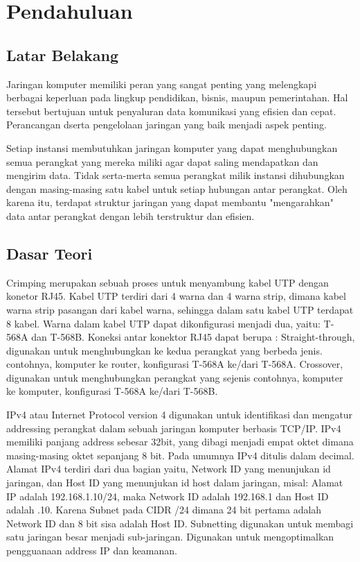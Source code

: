 \section{Pendahuluan}
\subsection{Latar Belakang}
Jaringan komputer memiliki peran yang sangat penting yang melengkapi berbagai keperluan pada lingkup pendidikan, bisnis, maupun pemerintahan. Hal tersebut bertujuan untuk penyaluran data komunikasi yang efisien dan cepat. Perancangan dserta pengelolaan jaringan yang baik menjadi aspek penting.

Setiap instansi membutuhkan jaringan komputer yang dapat menghubungkan semua perangkat yang mereka miliki agar dapat saling mendapatkan dan mengirim data. Tidak serta-merta semua perangkat milik instansi dihubungkan dengan masing-masing satu kabel untuk setiap hubungan antar perangkat. Oleh karena itu, terdapat struktur jaringan yang dapat membantu "mengarahkan" data antar perangkat dengan lebih terstruktur dan efisien.

\subsection{Dasar Teori}
Crimping merupakan sebuah proses untuk menyambung kabel UTP dengan konetor RJ45. Kabel UTP terdiri dari 4 warna dan 4 warna strip, dimana kabel warna strip pasangan dari kabel warna, sehingga dalam satu kabel UTP terdapat 8 kabel. Warna dalam kabel UTP dapat dikonfigurasi menjadi dua, yaitu: T-568A dan T-568B. Koneksi antar konektor RJ45 dapat berupa : Straight-through, digunakan untuk menghubungkan ke kedua perangkat yang berbeda jenis. contohnya, komputer ke router, konfigurasi T-568A ke/dari T-568A. Crossover, digunakan untuk menghubungkan perangkat yang sejenis contohnya, komputer ke komputer, konfigurasi T-568A ke/dari T-568B.

IPv4 atau Internet Protocol version 4 digunakan untuk identifikasi dan mengatur addressing perangkat dalam sebuah jaringan komputer berbasis TCP/IP. IPv4 memiliki panjang address sebesar 32bit, yang dibagi menjadi empat oktet dimana masing-masing oktet sepanjang 8 bit. Pada umumnya IPv4 ditulis dalam decimal. Alamat IPv4 terdiri dari dua bagian yaitu, Network ID yang menunjukan id jaringan, dan Host ID yang menunjukan id host dalam jaringan, misal: Alamat IP adalah 192.168.1.10/24, maka Network ID adalah 192.168.1 dan Host ID adalah .10. Karena Subnet pada CIDR /24 dimana 24 bit pertama adalah Network ID dan 8 bit sisa adalah Host ID. Subnetting digunakan untuk membagi satu jaringan besar menjadi sub-jaringan. Digunakan untuk mengoptimalkan pengguanaan address IP dan keamanan.

